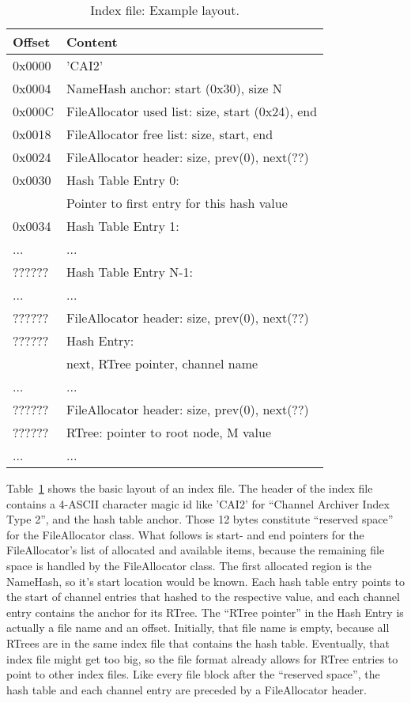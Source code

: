 \begin{table}[htbp]
  \begin{center}
    \sffamily
    \begin{tabular}{ll}
     Offset  & Content \\
     \hline
     0x0000  & 'CAI2' \\
     0x0004  & NameHash anchor: start (0x30), size N \\
     0x000C  & FileAllocator used list: size, start (0x24), end \\
     0x0018  & FileAllocator free list: size, start, end \\
     0x0024  & FileAllocator header: size, prev(0), next(??) \\
     0x0030  & Hash Table Entry 0: \\
             & Pointer to first entry for this hash value \\
     0x0034  & Hash Table Entry 1:  \\
     ...     & ... \\
     ??????  & Hash Table Entry N-1:  \\
     ...     & ... \\
     ??????  & FileAllocator header: size, prev(0), next(??) \\
     ??????  & Hash Entry: \\
             & next, RTree pointer, channel name \\
     ...     & ... \\  
     ??????  & FileAllocator header: size, prev(0), next(??) \\
     ??????  & RTree: pointer to root node, M value \\
     ...     & ... \\  
    \end{tabular}
    \caption{Index file: Example layout.}
    \label{tab:indexfile}
  \end{center}
\end{table}

\noindent Table~\ref{tab:indexfile} shows the basic layout of an index
file.  The header of the index file contains a 4-ASCII character magic
id like 'CAI2' for ``Channel Archiver Index Type 2'', and the hash
table anchor.  Those 12 bytes constitute ``reserved space'' for the
FileAllocator class. What follows is start- and end pointers for the
FileAllocator's list of allocated and available items, because the
remaining file space is handled by the FileAllocator class.  The first
allocated region is the NameHash, so it's start location would be
known. Each hash table entry points to the start of channel entries
that hashed to the respective value, and each channel entry contains
the anchor for its RTree.  The ``RTree pointer'' in the Hash Entry is
actually a file name and an offset. Initially, that file name is
empty, because all RTrees are in the same index file that contains the
hash table. Eventually, that index file might get too big, so the file
format already allows for RTree entries to point to other index files.
Like every file block after the ``reserved space'', the hash table and
each channel entry are preceded by a FileAllocator header.

